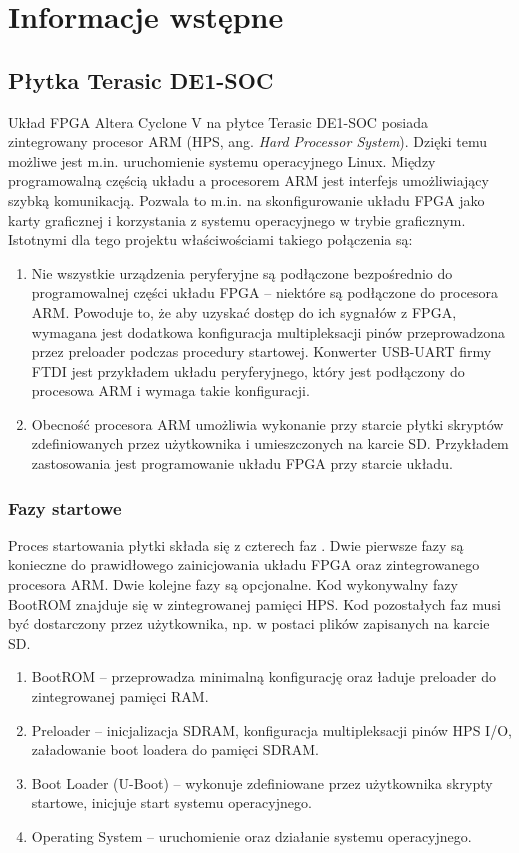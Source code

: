 \section{Informacje wstępne}
\label{sec:infornacje-wstepne}

\subsection{Płytka Terasic DE1-SOC}
Układ FPGA Altera Cyclone V na płytce Terasic DE1-SOC posiada zintegrowany procesor ARM (HPS, ang. \textit{Hard Processor System}). Dzięki temu możliwe jest m.in. uruchomienie systemu operacyjnego Linux. Między programowalną częścią układu a procesorem ARM jest interfejs umożliwiający szybką komunikacją. Pozwala to m.in. na skonfigurowanie układu FPGA jako karty graficznej i korzystania z systemu operacyjnego w trybie graficznym. Istotnymi dla tego projektu właściwościami takiego połączenia są:
\begin{enumerate}
\item Nie wszystkie urządzenia peryferyjne są podłączone bezpośrednio do programowalnej części układu FPGA -- niektóre są podłączone do procesora ARM. Powoduje to, że aby uzyskać dostęp do ich sygnałów z FPGA, wymagana jest dodatkowa konfiguracja multipleksacji pinów przeprowadzona przez preloader podczas procedury startowej. Konwerter USB-UART firmy FTDI jest przykładem układu peryferyjnego, który jest podłączony do procesowa ARM i wymaga takie konfiguracji.
\item Obecność procesora ARM umożliwia wykonanie przy starcie płytki skryptów zdefiniowanych przez użytkownika i umieszczonych na karcie SD. Przykładem zastosowania jest programowanie układu FPGA przy starcie układu.
\end{enumerate}


\subsubsection{Fazy startowe}
Proces startowania płytki składa się z czterech faz \cite[p. 1068]{altera-vol3}. Dwie pierwsze fazy są konieczne do prawidłowego zainicjowania układu FPGA oraz zintegrowanego procesora ARM. Dwie kolejne fazy są opcjonalne. Kod wykonywalny fazy BootROM znajduje się w zintegrowanej pamięci HPS. Kod pozostałych faz musi być dostarczony przez użytkownika, np. w postaci plików zapisanych na karcie SD.
\begin{enumerate}[noitemsep]
\item BootROM -- przeprowadza minimalną konfigurację oraz ładuje preloader do zintegrowanej pamięci RAM.
\item Preloader -- inicjalizacja SDRAM, konfiguracja multipleksacji pinów HPS I/O, załadowanie boot loadera do pamięci SDRAM.
\item Boot Loader (U-Boot) -- wykonuje zdefiniowane przez użytkownika skrypty startowe, inicjuje start systemu operacyjnego.
\item Operating System -- uruchomienie oraz działanie systemu operacyjnego.
\end{enumerate}


